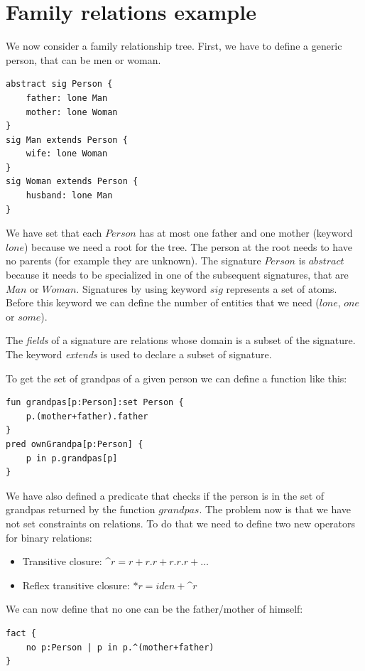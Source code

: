 \documentclass[12pt, a4paper]{report}
\begin{document}
        \section{Family relations example}
        We now consider a family relationship tree. First, we have to define a generic person, that can be men or woman.
        \begin{lstlisting}[language=alloy]
abstract sig Person {
    father: lone Man
    mother: lone Woman
}
sig Man extends Person {
    wife: lone Woman
}
sig Woman extends Person {
    husband: lone Man
}
        \end{lstlisting}
        We have set that each $Person$ has at most one father and one mother (keyword $lone$) because we need a root for the tree. The person at the root needs to have no parents 
        (for example they are unknown). The signature $Person$ is $abstract$ because it needs to be specialized in one of the subsequent signatures, that are $Man$ or $Woman$.
        Signatures by using keyword $sig$ represents a set of atoms. Before this keyword we can define the number of entities that we need ($lone$, $one$ or $some$).
        \begin{definition}
            The \emph{fields} of a signature are relations whose domain is a subset of the signature. The keyword \emph{extends} is used to declare a subset of signature. 
        \end{definition}
        To get the set of grandpas of a given person we can define a function like this: 
        \begin{lstlisting}[language=alloy]
fun grandpas[p:Person]:set Person {
    p.(mother+father).father
}
pred ownGrandpa[p:Person] {
    p in p.grandpas[p]
}
        \end{lstlisting}
        We have also defined a predicate that checks if the person is in the set of grandpas returned by the function $grandpas$. The problem now is that we have not set constraints 
        on relations. To do that we need to define two new operators for binary relations:
        \begin{itemize}
            \item Transitive closure: \textasciicircum $r=r+r.r+r.r.r+\dots$
            \item Reflex transitive closure: $*r=iden+$\textasciicircum$r$
        \end{itemize}
        We can now define that no one can be the father/mother of himself: 
        \begin{lstlisting}[language=alloy]
fact {
    no p:Person | p in p.^(mother+father)
}
        \end{lstlisting}
\end{document}
